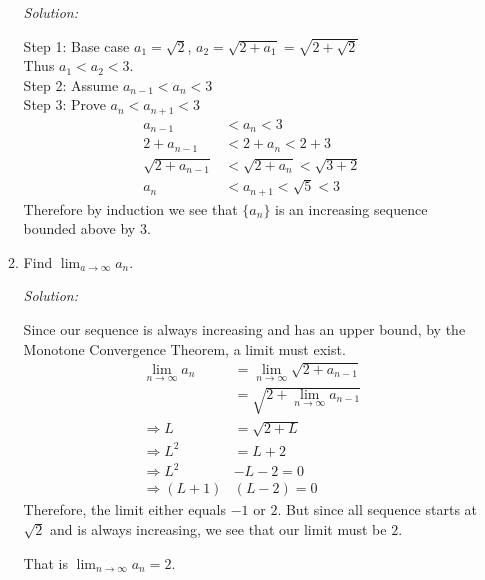 \documentclass[12pt]{article}
\theoremstyle{remark}
\begin{document}
\begin{enumerate}
\begin{enumerate}
\begin{mdframed}[style=TheoremFrame]
\textit{Solution:}

Step 1: Base case $a_1 = \sqrt{2}$, $a_2 = \sqrt{2+ a_1} = \sqrt{2+\sqrt{2}}$\\
Thus $a_1 < a_2 < 3$.\\

Step 2: Assume $a_{n-1}<a_n<3$\\

Step 3: Prove $a_n < a_{n+1} < 3$
\begin{align*}
a_{n-1} &< a_{n} < 3\\
2+a_{n-1} &< 2+a_{n} < 2+3\\
\sqrt{2+a_{n-1}} &< \sqrt{2+a_{n}} < \sqrt{3+2}\\
a_{n}&<a_{n+1}<\sqrt{5}<3
\end{align*}
Therefore by induction we see that $\{ a_n \}$ is an increasing sequence bounded above by $3$.
\end{mdframed}
\item Find $\displaystyle{ \lim_{a \rightarrow \infty} a_n}$.
\begin{mdframed}[style=TheoremFrame]
\textit{Solution:}

Since our sequence is always increasing and has an upper bound, by the Monotone Convergence Theorem, a limit must exist.
\begin{align*}
\lim_{n\rightarrow \infty} a_n &= \lim_{n\rightarrow \infty} \sqrt{2+a_{n-1}}\\
&= \sqrt{2+\lim_{n\rightarrow \infty}a_{n-1}}\\
\Rightarrow L &= \sqrt{2+L}\\
\Rightarrow L^2 &= L+2\\
 \Rightarrow L^2 &- L -2 =0\\
\Rightarrow (L+1)&(L-2) =0
\end{align*}
Therefore, the limit either equals $-1$ or $2$. But since all sequence starts at $\sqrt{2}$ and is always increasing, we see that our limit must be $2$.

That is $\displaystyle{ \lim_{n\rightarrow \infty} a_n = 2}$.
\end{mdframed}
\end{enumerate}
\end{enumerate}
\end{document}
